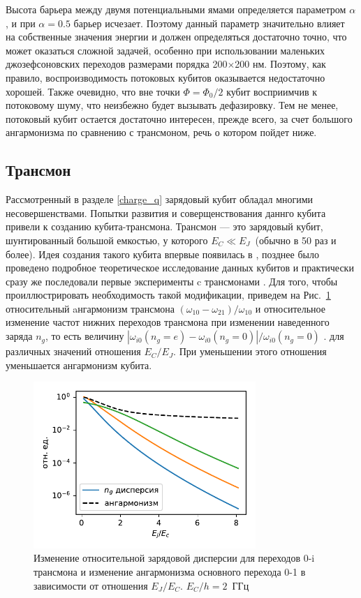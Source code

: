 Высота барьера между двумя потенциальными ямами определяется параметром $\alpha$, и при $\alpha=0.5$ барьер исчезает. Поэтому данный параметр значительно влияет на собственные значения энергии и должен определяться достаточно точно, что может оказаться сложной задачей, особенно при использовании маленьких джозефсоновских переходов размерами порядка 200$\times$200 нм. Поэтому, как правило, воспроизводимость потоковых кубитов оказывается недостаточно хорошей. Также очевидно, что вне точки $\Phi=\Phi_0/2$ кубит восприимчив к потоковому шуму, что неизбежно будет вызывать дефазировку. Тем не менее, потоковый кубит остается достаточно интересен, прежде всего, за счет большого ангармонизма по сравнению с трансмоном, речь о котором пойдет ниже.  
\subsection{Трансмон} Рассмотренный в разделе \ref{charge_q} зарядовый кубит обладал многими несовершенствами. Попытки развития и соверщенствования даннго кубита привели к созданию кубита-трансмона. Трансмон --- это зарядовый кубит, шунтированный большой емкостью, у которого $E_C \ll E_J$~(обычно в 50 раз и более). Идея создания такого кубита впервые появилась в \cite{cottet2002implementation}, позднее было проведено подробное теоретическое исследование данных кубитов \cite{koch2007charge} и практически сразу же последовали первые эксперименты c трансмонами \cite{transmon}. Для того, чтобы проиллюстрировать необходимость такой модификации, приведем на Рис.~\ref{img: disp_vs_anh} относительный  aнгармонизм трансмона $(\omega_{10}-\omega_{21})/\omega_{10}$ и относительное изменение частот нижних переходов трансмона при изменении наведенного заряда $n_g$, то есть величину $|\omega_{i0}(n_g=e)-\omega_{i0}(n_g=0)|/\omega_{i0}(n_g=0)$ .  для различных значений отношения $E_C/E_J$. При уменьшении этого отношения уменьшается ангармонизм кубита.
\begin{figure}[h]\center
	\includegraphics[width=0.75\textwidth]{images/disp_vs_anh.pdf}
	\caption{Изменение относительной зарядовой дисперсии для переходов 0-i трансмона и изменение ангармонизма основного перехода 0-1 в зависимости от отношения $E_J/E_C$. $E_C/h = 2$~ГГц}
	\label{img: disp_vs_anh}
\end{figure}
